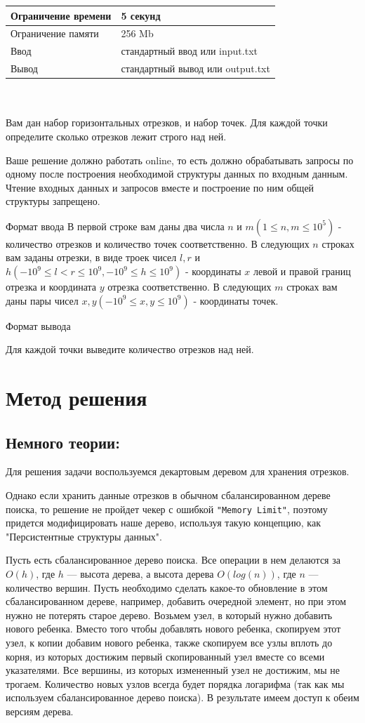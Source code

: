 \documentclass[12pt]{article}
\begin{document}
\begin{tabular}{|l|l|}
\hline Ограничение времени & 5 секунд \\
\hline Ограничение памяти & 256 Mb \\
\hline Ввод & стандартный ввод или input.txt \\
\hline Вывод & стандартный вывод или output.txt \\
\hline
\end{tabular}  \\\\
Вам дан набор горизонтальных отрезков, и набор точек. Для каждой точки определите сколько отрезков лежит строго над ней.

Ваше решение должно работать online, то есть должно обрабатывать запросы по одному после построения необходимой структуры данных по входным данным. Чтение входных данных и запросов вместе и построение по ним общей структуры запрещено.

Формат ввода
В первой строке вам даны два числа $n$ и $m\left(1 \leq n, m \leq 10^5\right)$ - количество отрезков и количество точек соответственно. В следующих $n$ строках вам заданы отрезки, в виде троек чисел $l, r$ и $h\left(-10^9 \leq l<r \leq 10^9,-10^9 \leq h \leq 10^9\right)$ - координаты $x$ левой и правой границ отрезка и координата $y$ отрезка соответственно. В следующих $m$ строках вам даны пары чисел $x, y\left(-10^9 \leq x, y \leq 10^9\right)$ - координаты точек.

Формат вывода

Для каждой точки выведите количество отрезков над ней.

\section*{Метод решения}
\subsection*{Немного теории: }
Для решения задачи воспользуемся декартовым деревом для хранения отрезков.

Однако если хранить данные отрезков в обычном сбалансированном дереве поиска, то решение не пройдет чекер с ошибкой \texttt{"Memory Limit"}, поэтому придется модифицировать наше дерево, используя такую концепцию, как "Персистентные структуры данных".

Пусть есть сбалансированное дерево поиска. Все операции в нем делаются за $O(h)$, где $h$ — высота дерева, а высота дерева $O (log (n))$, где $n$ — количество вершин. Пусть необходимо сделать какое-то обновление в этом сбалансированном дереве, например, добавить очередной элемент, но при этом нужно не потерять старое дерево. Возьмем узел, в который нужно добавить нового ребенка. Вместо того чтобы добавлять нового ребенка, скопируем этот узел, к копии добавим нового ребенка, также скопируем все узлы вплоть до корня, из которых достижим первый скопированный узел вместе со всеми указателями. Все вершины, из которых измененный узел не достижим, мы не трогаем. Количество новых узлов всегда будет порядка логарифма (так как мы используем сбалансированное дерево поиска). В результате имеем доступ к обеим версиям дерева. \\
\end{document}
